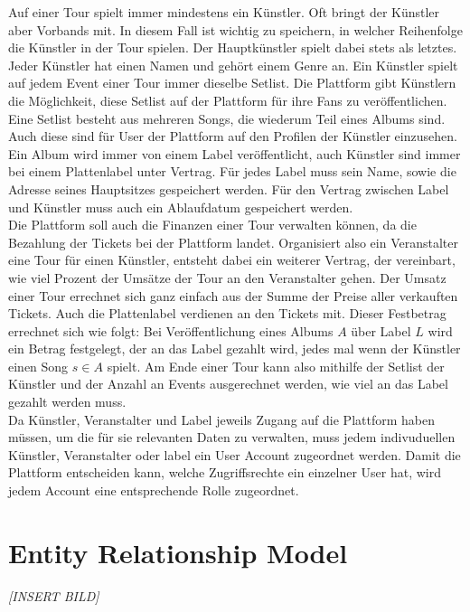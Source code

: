 \documentclass[12pt, oneside, a4paper]{article}
\begin{document}
Auf einer Tour spielt immer mindestens ein Künstler. Oft bringt der Künstler aber Vorbands mit. In diesem Fall ist wichtig zu speichern, in welcher Reihenfolge die Künstler in der Tour spielen. Der Hauptkünstler spielt dabei stets als letztes. Jeder Künstler hat einen Namen und gehört einem Genre an.  Ein Künstler spielt auf jedem Event einer Tour immer dieselbe Setlist. Die Plattform gibt Künstlern die Möglichkeit, diese Setlist auf der Plattform für ihre Fans zu veröffentlichen. Eine Setlist besteht aus mehreren Songs, die wiederum Teil eines Albums sind. Auch diese sind für User der Plattform auf den Profilen der Künstler einzusehen. Ein Album wird immer von einem Label veröffentlicht, auch Künstler sind immer bei einem Plattenlabel unter Vertrag. Für jedes Label muss sein Name, sowie die Adresse seines Hauptsitzes gespeichert werden. Für den Vertrag zwischen Label und Künstler muss auch ein Ablaufdatum gespeichert werden.\\
Die Plattform soll auch die Finanzen einer Tour verwalten können, da die Bezahlung der Tickets bei der Plattform landet.  Organisiert also ein Veranstalter eine Tour für einen Künstler, entsteht dabei ein weiterer Vertrag, der vereinbart, wie viel Prozent der Umsätze der Tour an den Veranstalter gehen. Der Umsatz einer Tour errechnet sich ganz einfach aus der Summe der Preise aller verkauften Tickets. Auch die Plattenlabel verdienen an den Tickets mit. Dieser Festbetrag errechnet sich wie folgt: Bei Veröffentlichung eines Albums $A$ über Label $L$ wird ein Betrag festgelegt, der an das Label gezahlt wird, jedes mal wenn der Künstler einen Song $s \in A$ spielt. Am Ende einer Tour kann also mithilfe der Setlist der Künstler und der Anzahl an Events ausgerechnet werden, wie viel an das Label gezahlt werden muss.\\
Da Künstler, Veranstalter und Label jeweils Zugang auf die Plattform haben müssen, um die für sie relevanten Daten zu verwalten, muss jedem indivuduellen Künstler, Veranstalter oder label ein User Account zugeordnet werden. Damit die Plattform entscheiden kann, welche Zugriffsrechte ein einzelner User hat, wird jedem Account eine entsprechende Rolle zugeordnet.

\section{Entity Relationship Model}
\textit{[INSERT BILD]}
\end{document}
